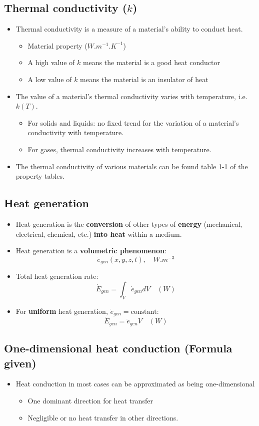 \documentclass[11pt]{article}
\begin{document}
\subsection{Thermal conductivity (\(k\))}
\label{sec:org238cd29}
\begin{itemize}
\item Thermal conductivity is a measure of a material's ability to conduct heat.
\begin{itemize}
\item Material property (\(\unit{W.m^{-1}.K^{-1}}\))
\item A high value of \(k\) means the material is a good heat conductor
\item A low value of \(k\) means the material is an insulator of heat
\end{itemize}
\item The value of a material's thermal conductivity varies with temperature, i.e. \(k(T)\).
\begin{itemize}
\item For solids and liquids: no fixed trend for the variation of a material's conductivity with temperature.
\item For gases, thermal conductivity increases with temperature.
\end{itemize}
\item The thermal conductivity of various materials can be found table 1-1 of the property tables.
\end{itemize}

\subsection{Heat generation}
\label{sec:orgdc5835b}
\begin{itemize}
\item Heat generation is the \textbf{conversion} of other types of \textbf{energy} (mechanical, electrical, chemical, etc.) \textbf{into heat} within a medium.
\item Heat generation is a \textbf{volumetric phenomenon}:
\[\dot{e}_{gen} (x, y, z, t), \quad \unit{W.m^{-3}}\]
\item Total heat generation rate:
\[\dot{E}_{gen} = \int_V \dot{e}_{gen} dV \quad (\unit{W})\]
\item For \textbf{uniform} heat generation, \(\dot{e}_{gen} = \text{constant}\):
\[\dot{E}_{gen} = \dot{e}_{gen} V \quad (\unit{W})\]
\end{itemize}

\subsection{One-dimensional heat conduction (Formula given)}
\label{sec:org7c015c1}
\begin{itemize}
\item Heat conduction in most cases can be approximated as being one-dimensional
\begin{itemize}
\item One dominant direction for heat transfer
\item Negligible or no heat transfer in other directions.
\end{itemize}
\end{itemize}
\end{document}
